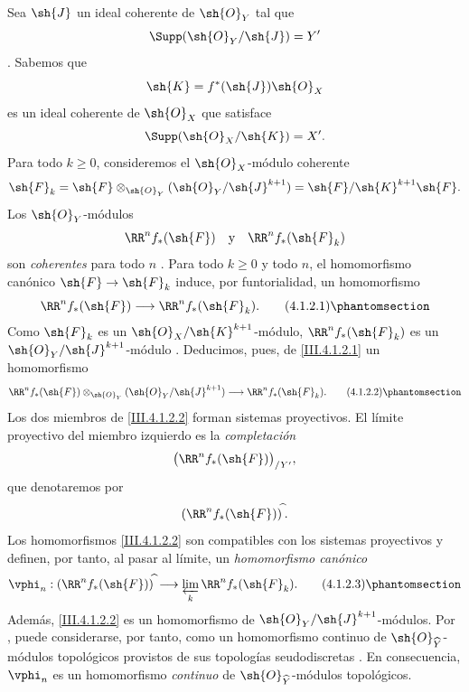 \documentclass[oneside]{amsart}
\makeatletter
\renewcommand{\geq}{\geqslant}
\newcommand{\ega@arrow}[2]{\mathchoice{#1}{#2}{#2}{#2}}
\renewcommand{\to}{\ega@arrow{\longrightarrow}{\rightarrow}}
\let\EGAOriginalLabel\label
\renewcommand{\label}[1]{\phantomsection\EGAOriginalLabel{#1}}
\makeatother
\begin{document}
\begin{env}[4.1.2]
\label{III.4.1.2}
Sea $\sh{J}$ un ideal coherente de $\sh{O}_Y$ tal que
\[
  \Supp(\sh{O}_Y/\sh{J})=Y'
\]
.
Sabemos  que
\[
  \sh{K}=f^*(\sh{J})\sh{O}_X
\]
es un ideal coherente de $\sh{O}_X$ que satisface
\[
  \Supp(\sh{O}_X/\sh{K})=X'.
\]
Para todo $k\geq0$, consideremos el $\sh{O}_X$-módulo coherente
\[
  \sh{F}_k
  =
  \sh{F}\otimes_{\sh{O}_Y}(\sh{O}_Y/\sh{J}^{k+1})
  =
  \sh{F}/\sh{K}^{k+1}\sh{F}.
\]
Los $\sh{O}_Y$-módulos
\[
  \RR^n f_*(\sh{F})
  \quad\text{y}\quad
  \RR^n f_*(\sh{F}_k)
\]
son \emph{coherentes} para todo $n$ .
Para todo $k\geq0$ y todo $n$, el homomorfismo canónico
$\sh{F}\to\sh{F}_k$ induce, por funtorialidad, un homomorfismo
\[
  \RR^n f_*(\sh{F})
  \longrightarrow
  \RR^n f_*(\sh{F}_k).
  \tag{4.1.2.1}
  \label{III.4.1.2.1}
\]
Como $\sh{F}_k$ es un $\sh{O}_X/\sh{K}^{k+1}$-módulo,
$\RR^n f_*(\sh{F}_k)$ es un
$\sh{O}_Y/\sh{J}^{k+1}$-módulo .
Deducimos, pues, de \eqref{III.4.1.2.1} un homomorfismo
\[
  \RR^n f_*(\sh{F})
  \otimes_{\sh{O}_Y}(\sh{O}_Y/\sh{J}^{k+1})
  \longrightarrow
  \RR^n f_*(\sh{F}_k).
  \tag{4.1.2.2}
  \label{III.4.1.2.2}
\]
Los dos miembros de \eqref{III.4.1.2.2} forman sistemas proyectivos.
El límite proyectivo del miembro izquierdo es la \emph{completación}
\[
  \bigl(\RR^n f_*(\sh{F})\bigr)_{/Y'},
\]
que denotaremos por
\[
  (\RR^n f_*(\sh{F}))^{\widehat{\,}}.
\]
Los homomorfismos \eqref{III.4.1.2.2} son compatibles con los sistemas
proyectivos y definen, por tanto, al pasar al límite, un \emph{homomorfismo
canónico}
\[
  \vphi_n:
  (\RR^n f_*(\sh{F}))^{\widehat{\,}}
  \longrightarrow
  \varprojlim_k\RR^n f_*(\sh{F}_k).
  \tag{4.1.2.3}
  \label{III.4.1.2.3}
\]
Además, \eqref{III.4.1.2.2} es un homomorfismo de
$\sh{O}_Y/\sh{J}^{k+1}$-módulos.
Por , puede considerarse, por tanto, como un
homomorfismo continuo de $\sh{O}_{\widehat{Y}}$-módulos topológicos
provistos de sus topologías seudodiscretas .
En consecuencia, $\vphi_n$ es un homomorfismo \emph{continuo} de
$\sh{O}_{\widehat{Y}}$-módulos topológicos.
\end{env}
\end{document}
